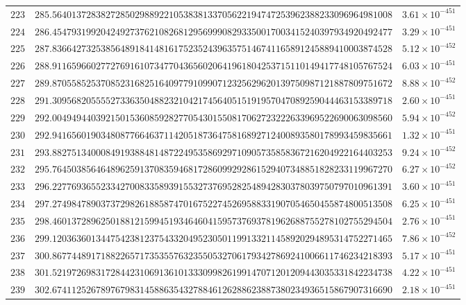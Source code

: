 \documentclass[12pt,reqno]{amsart}
\theoremstyle{remark}
\begin{document}
\begin{longtable}{clc}
$223$ & $285.5640137283827285029889221053838133705622194747253962388233096964981008$ & $3.61\times 10^{-451}$ \\
$224$ & $286.4547931992042492737621082681295699908293350017003415240397934920492477$ & $3.29\times 10^{-451}$ \\
$225$ & $287.8366427325385648918414816175235243963575146741165891245889410003874528$ & $5.12\times 10^{-452}$ \\
$226$ & $288.9116596602772769161073477043656020641961804253715110149417748105767524$ & $6.03\times 10^{-451}$ \\
$227$ & $289.8705585253708523168251640977910990712325629620139750987121887809751672$ & $8.88\times 10^{-452}$ \\
$228$ & $291.3095682055552733635048823210421745640515191957047089259044463153389718$ & $2.60\times 10^{-451}$ \\
$229$ & $292.0049494403921501536085928277054301550817062723222633969522690063098560$ & $5.94\times 10^{-452}$ \\
$230$ & $292.9416560190348087766463711420518736475816892712400893580178993459835661$ & $1.32\times 10^{-451}$ \\
$231$ & $293.8827513400084919388481487224953586929710905735858367216204922164403253$ & $9.24\times 10^{-452}$ \\
$232$ & $295.7645038564648962591370835946817286099292861529407348851828233119967270$ & $6.27\times 10^{-452}$ \\
$233$ & $296.2277693655233427008335893915532737695282548942830378039750797010961391$ & $3.60\times 10^{-451}$ \\
$234$ & $297.2749847890373729826188587470167522745269588331907054650455874800513508$ & $6.25\times 10^{-451}$ \\
$235$ & $298.4601372896250188121599451934646041595737693781962688755278102755294504$ & $2.76\times 10^{-451}$ \\
$236$ & $299.1203636013447542381237543320495230501199133211458920294895314752271465$ & $7.86\times 10^{-452}$ \\
$237$ & $300.8677448917188226571735355763235505327061793427869241006611746234218393$ & $5.17\times 10^{-451}$ \\
$238$ & $301.5219726983172844231069136101333099826199147071201209443035331842234738$ & $4.22\times 10^{-451}$ \\
$239$ & $302.6741125267897679831458863543278846126288623887380234936515867907316690$ & $2.18\times 10^{-451}$ \\

\end{longtable}
\end{document}
